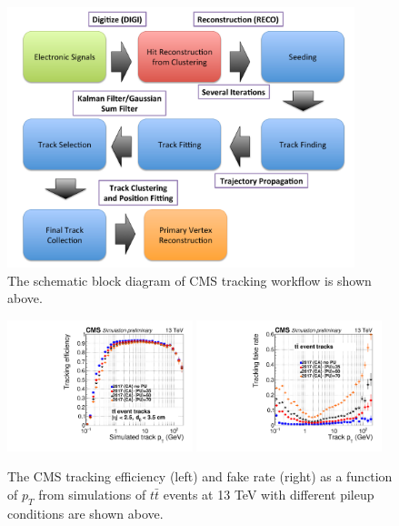 \begin{figure}[hbtp]
\begin{center}
\includegraphics[width=0.90\textwidth]{Figures/Chapter2/TrackWF.pdf}
\caption{The schematic block diagram of CMS tracking workflow is shown above.}
\label{TrackWorkFlow}
\end{center}
\end{figure} 



\begin{figure}[hbtp]
\begin{center}
\includegraphics[width=0.48\textwidth]{Figures/Chapter2/TrackPTEff.pdf}
\includegraphics[width=0.48\textwidth]{Figures/Chapter2/TrackPTFake.pdf}
\caption{The CMS tracking efficiency (left) and fake rate (right) as a function of $p_T$ from simulations of $t \bar t$ events at 13 TeV with different pileup conditions are shown above.}
\label{CMSTrackPer}
\end{center}
\end{figure} 

